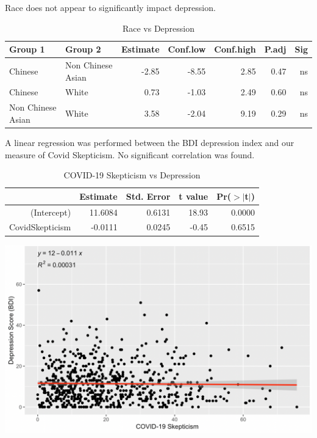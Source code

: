 \documentclass{article}
\begin{document}
\bigskip
\bigskip
\noindent
Race does not appear to significantly impact depression. 

\begin{table}[ht]
\centering
\caption{Race vs Depression} \label{tab:title}
\begin{tabular}{llrrrrr}
  \hline
Group 1 & Group 2 & Estimate & Conf.low & Conf.high & P.adj & Sig \\ 
  \hline
Chinese & Non Chinese Asian & -2.85 & -8.55 & 2.85 & 0.47 & ns \\ 
Chinese & White & 0.73 & -1.03 & 2.49 & 0.60 & ns \\ 
Non Chinese Asian & White & 3.58 & -2.04 & 9.19 & 0.29 & ns \\ 
   \hline
\end{tabular}
\end{table}

\pagebreak
\vspace*{\fill}

\noindent
A linear regression was performed between the BDI depression index and our measure of Covid Skepticism. No significant correlation was found.

\begin{table}[ht]
\centering
\caption{COVID-19 Skepticism vs Depression} \label{tab:title}
\begin{tabular}{rrrrr}
  \hline
 & Estimate & Std. Error & t value & Pr($>$$|$t$|$) \\ 
  \hline
(Intercept) & 11.6084 & 0.6131 & 18.93 & 0.0000 \\ 
  CovidSkepticism & -0.0111 & 0.0245 & -0.45 & 0.6515 \\ 
   \hline
\end{tabular}
\end{table}

\bigskip
\bigskip
\bigskip
\bigskip
\bigskip

{\centering \includegraphics[scale=0.6]{BDICOVIDgraph.png} \par}
\end{document}

